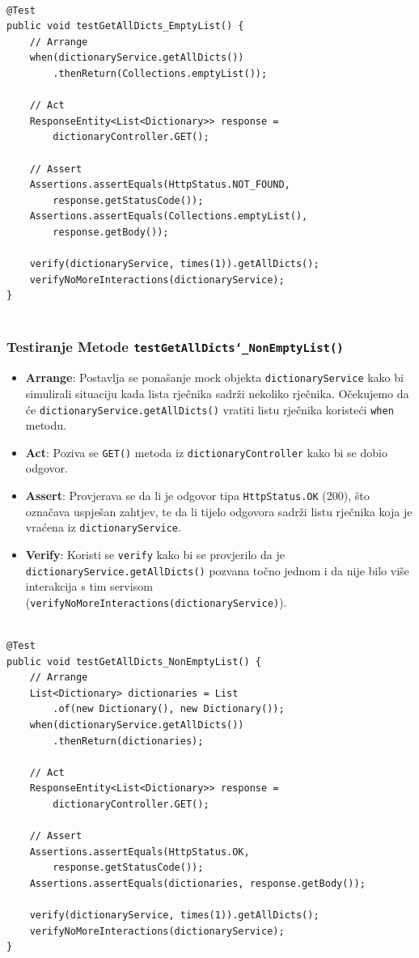 			\begin{lstlisting}
				
@Test
public void testGetAllDicts_EmptyList() {
	// Arrange
	when(dictionaryService.getAllDicts())
		.thenReturn(Collections.emptyList());
	
	// Act
	ResponseEntity<List<Dictionary>> response = 
		dictionaryController.GET();
	
	// Assert
	Assertions.assertEquals(HttpStatus.NOT_FOUND, 
		response.getStatusCode());
	Assertions.assertEquals(Collections.emptyList(), 
		response.getBody());
	
	verify(dictionaryService, times(1)).getAllDicts();
	verifyNoMoreInteractions(dictionaryService);
}
				
			\end{lstlisting}
			
			\subsubsection{Testiranje Metode \texttt{testGetAllDicts\char`_NonEmptyList()}}	
			
			\begin{itemize}
				\item \textbf{Arrange}: Postavlja se ponašanje mock objekta \texttt{dictionaryService} kako bi simulirali situaciju kada lista rječnika sadrži nekoliko rječnika. Očekujemo da će \texttt{dictionaryService.getAllDicts()} vratiti listu rječnika koristeći \texttt{when} metodu.
				
				\item \textbf{Act}: Poziva se \texttt{GET()} metoda iz \texttt{dictionaryController} kako bi se dobio odgovor.
				
				\item \textbf{Assert}: Provjerava se da li je odgovor tipa \texttt{HttpStatus.OK} (200), što označava uspješan zahtjev, te da li tijelo odgovora sadrži listu rječnika koja je vraćena iz \texttt{dictionaryService}.
				
				\item \textbf{Verify}: Koristi se \texttt{verify} kako bi se provjerilo da je \texttt{dictionaryService.getAllDicts()} pozvana točno jednom i da nije bilo više interakcija s tim servisom (\texttt{verifyNoMoreInteractions(dictionaryService)}).
			\end{itemize}
			
			\begin{lstlisting}
				
@Test
public void testGetAllDicts_NonEmptyList() {
	// Arrange
	List<Dictionary> dictionaries = List
		.of(new Dictionary(), new Dictionary());
	when(dictionaryService.getAllDicts())
		.thenReturn(dictionaries);
	
	// Act
	ResponseEntity<List<Dictionary>> response = 
		dictionaryController.GET();
	
	// Assert
	Assertions.assertEquals(HttpStatus.OK, 
		response.getStatusCode());
	Assertions.assertEquals(dictionaries, response.getBody());
	
	verify(dictionaryService, times(1)).getAllDicts();
	verifyNoMoreInteractions(dictionaryService);
}
				
			\end{lstlisting}
			

